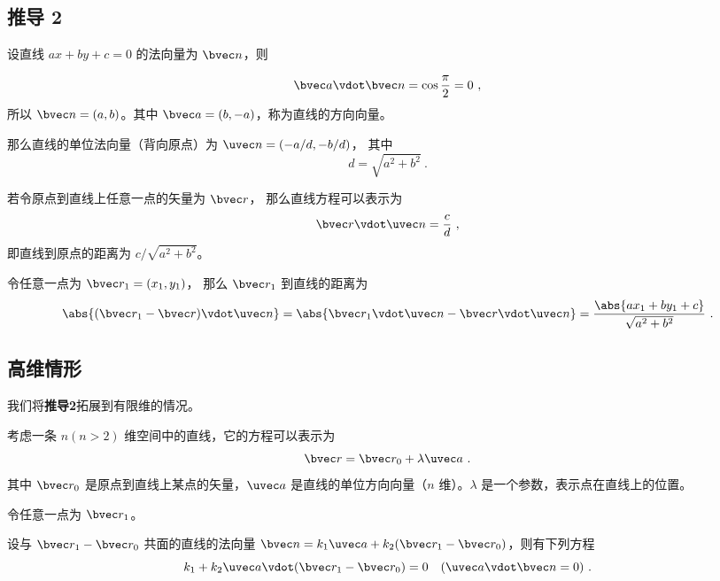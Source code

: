 \subsection{推导 2}

设直线 $ax + by + c = 0$ 的法向量为 $\bvec n$，则

\begin{equation}
\bvec a \vdot \bvec n = \cos \frac{\pi}{2} = 0~,
\end{equation}
所以 $\bvec n=(a,b)$。其中 $\bvec a=(b,-a)$，称为直线的方向向量。

那么直线的单位法向量（背向原点）为 $\uvec n = (-a/d, -b/d)$， 其中
\begin{equation}
d = \sqrt{a^2 + b^2}~.
\end{equation}

若令原点到直线上任意一点的矢量为 $\bvec r$， 那么直线方程可以表示为
\begin{equation}
\bvec r \vdot \uvec n = \frac{c}{d}~,
\end{equation}
即直线到原点的距离为 $c/\sqrt{a^2 + b^2}$。

令任意一点为 $\bvec r_1 = (x_1, y_1)$， 那么 $\bvec r_1$ 到直线的距离为
\begin{equation}
\abs{(\bvec r_1 - \bvec r)\vdot \uvec n} = \abs{\bvec r_1\vdot \uvec n - \bvec r \vdot \uvec n}
= \frac{\abs{ax_1 + by_1 + c}}{\sqrt{a^2 + b^2}}~.
\end{equation}


 






\subsection{高维情形}


我们将\textbf{推导2}拓展到有限维的情况。

考虑一条 $n(n>2)$ 维空间中的直线，它的方程可以表示为
\begin{equation}
\bvec r = \bvec r_0 + \lambda\uvec a~.
\end{equation}
其中 $\bvec r_0$ 是原点到直线上某点的矢量，$\uvec a$ 是直线的单位方向向量（$n$ 维）。$\lambda$ 是一个参数，表示点在直线上的位置。

令任意一点为 $\bvec r_1$。

设与 $\bvec r_1 - \bvec r_0$ 共面的直线的法向量 $\bvec n=k_1 \uvec a + k_2 (\bvec r_1 - \bvec r_0)$，则有下列方程
\begin{equation}
k_1 + k_2 \uvec a \vdot (\bvec r_1 - \bvec r_0) = 0 \quad (\uvec a \vdot \bvec n = 0)~.
\end{equation}

